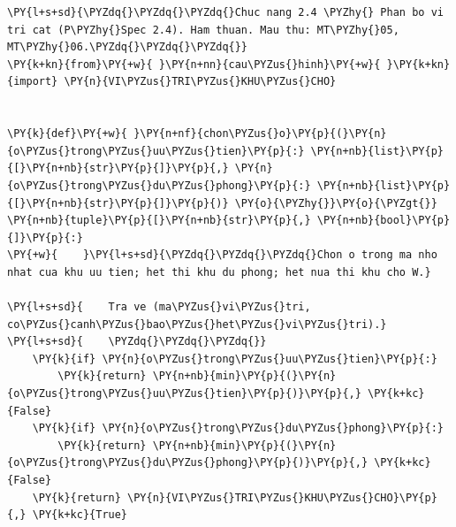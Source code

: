 \begin{Verbatim}[commandchars=\\\{\},frame=single,framerule=0.3pt,rulecolor=\color{black!40},fontsize=\footnotesize,breaklines=true]
\PY{l+s+sd}{\PYZdq{}\PYZdq{}\PYZdq{}Chuc nang 2.4 \PYZhy{} Phan bo vi tri cat (P\PYZhy{}Spec 2.4). Ham thuan. Mau thu: MT\PYZhy{}05, MT\PYZhy{}06.\PYZdq{}\PYZdq{}\PYZdq{}}
\PY{k+kn}{from}\PY{+w}{ }\PY{n+nn}{cau\PYZus{}hinh}\PY{+w}{ }\PY{k+kn}{import} \PY{n}{VI\PYZus{}TRI\PYZus{}KHU\PYZus{}CHO}


\PY{k}{def}\PY{+w}{ }\PY{n+nf}{chon\PYZus{}o}\PY{p}{(}\PY{n}{o\PYZus{}trong\PYZus{}uu\PYZus{}tien}\PY{p}{:} \PY{n+nb}{list}\PY{p}{[}\PY{n+nb}{str}\PY{p}{]}\PY{p}{,} \PY{n}{o\PYZus{}trong\PYZus{}du\PYZus{}phong}\PY{p}{:} \PY{n+nb}{list}\PY{p}{[}\PY{n+nb}{str}\PY{p}{]}\PY{p}{)} \PY{o}{\PYZhy{}}\PY{o}{\PYZgt{}} \PY{n+nb}{tuple}\PY{p}{[}\PY{n+nb}{str}\PY{p}{,} \PY{n+nb}{bool}\PY{p}{]}\PY{p}{:}
\PY{+w}{    }\PY{l+s+sd}{\PYZdq{}\PYZdq{}\PYZdq{}Chon o trong ma nho nhat cua khu uu tien; het thi khu du phong; het nua thi khu cho W.}

\PY{l+s+sd}{    Tra ve (ma\PYZus{}vi\PYZus{}tri, co\PYZus{}canh\PYZus{}bao\PYZus{}het\PYZus{}vi\PYZus{}tri).}
\PY{l+s+sd}{    \PYZdq{}\PYZdq{}\PYZdq{}}
    \PY{k}{if} \PY{n}{o\PYZus{}trong\PYZus{}uu\PYZus{}tien}\PY{p}{:}
        \PY{k}{return} \PY{n+nb}{min}\PY{p}{(}\PY{n}{o\PYZus{}trong\PYZus{}uu\PYZus{}tien}\PY{p}{)}\PY{p}{,} \PY{k+kc}{False}
    \PY{k}{if} \PY{n}{o\PYZus{}trong\PYZus{}du\PYZus{}phong}\PY{p}{:}
        \PY{k}{return} \PY{n+nb}{min}\PY{p}{(}\PY{n}{o\PYZus{}trong\PYZus{}du\PYZus{}phong}\PY{p}{)}\PY{p}{,} \PY{k+kc}{False}
    \PY{k}{return} \PY{n}{VI\PYZus{}TRI\PYZus{}KHU\PYZus{}CHO}\PY{p}{,} \PY{k+kc}{True}
\end{Verbatim}
